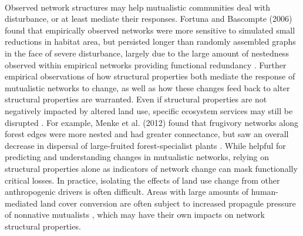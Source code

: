     \paragraph{}
    Observed network structures may help mutualistic communities deal with disturbance, or at least mediate their responses. Fortuna and Bascompte (2006) found that empirically observed networks were more sensitive to simulated small reductions in habitat area, but persisted longer than randomly assembled graphs in the face of severe disturbance, largely due to the large amount of nestedness observed within empirical networks providing functional redundancy \parencite{fortuna2006habitat}. Further empirical observations of how structural properties both mediate the response of mutualistic networks to change, as well as how these changes feed back to alter structural properties are warranted. Even if structural properties are not negatively impacted by altered land use, specific ecosystem services may still be disrupted \parencite{menke2012plant}. For example, Menke et al. (2012) found that frugivory networks along forest edges were more nested and had greater connectance,  but saw an overall decrease in dispersal of large-fruited forest-specialist plants \parencite{menke2012plant}. While helpful for predicting and understanding changes in mutualistic networks, relying on structural properties alone as indicators of network change can mask functionally critical losses. In practice, isolating the effects of land use change from other anthropogenic drivers is often difficult. Areas with large amounts of human-mediated land cover conversion are often subject to increased propagule pressure of nonnative mutualists \parencite{liu2023impact}, which may have their own impacts on network structural properties. 









